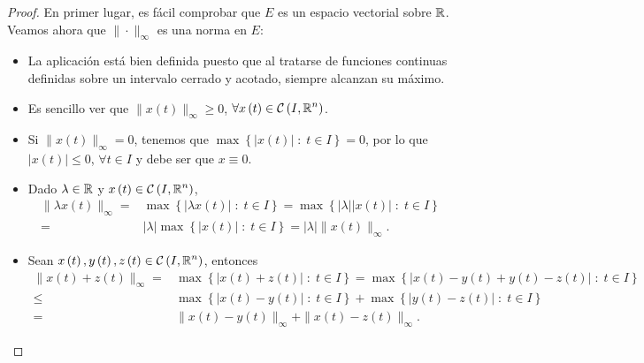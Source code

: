 \begin{proof}
	En primer lugar, es fácil comprobar que $\displaystyle E $ es un espacio vectorial sobre $\displaystyle \mathbb{R} $. Veamos ahora que $\displaystyle \| \cdot \|_{\infty} $ es una norma en $\displaystyle E $:
	\begin{itemize}
	\item La aplicación está bien definida puesto que al tratarse de funciones continuas definidas sobre un intervalo cerrado y acotado, siempre alcanzan su máximo.
	\item Es sencillo ver que $\displaystyle \| x\left(t\right)\|_{\infty} \geq 0 $, $\displaystyle \forall x\left(t\right) \in \mathcal{C}\left(I, \mathbb{R}^{n}\right) $. 
	\item Si $\displaystyle \|x\left(t\right)\|_{\infty}=0 $, tenemos que $\displaystyle \max \left\{ \left|x\left(t\right)\right| \; : \; t \in I\right\} =0  $, por lo que $\displaystyle \left|x\left(t\right)\right|\leq 0 $, $\displaystyle \forall t \in I $ y debe ser que $\displaystyle x \equiv 0 $.
	\item Dado $\displaystyle \lambda \in \mathbb{R} $ y $\displaystyle x\left(t\right)\in \mathcal{C}\left(I, \mathbb{R}^{n}\right) $, 
		\[
		\begin{split}
			\|\lambda x\left(t\right)\|_{\infty} = & \max \left\{ \left|\lambda x\left(t\right)\right| \; : \; t \in I\right\} = \max \left\{ \left|\lambda \right| \left|x\left(t\right)\right| \; : \; t \in I\right\} \\
			= &  \left|\lambda \right| \max \left\{ \left|x\left(t\right)\right|\; : \; t \in I\right\} =\left|\lambda \right|  \|x\left(t\right)\|_{\infty} .
		\end{split}
		\]
	\item Sean $\displaystyle x\left(t\right), y\left(t\right), z\left(t\right) \in \mathcal{C}\left(I, \mathbb{R}^{n}\right) $, entonces
		\[
		\begin{split}
			\|x\left(t\right)+z\left(t\right)\|_{\infty} = & \max \left\{ \left|x\left(t\right) + z\left(t\right)\right| \; : \; t \in I\right\} = \max \left\{ \left|x\left(t\right)-y\left(t\right)+y\left(t\right)-z\left(t\right)\right| \; : \; t \in I\right\}\\
			\leq & \max \left\{ \left|x\left(t\right)-y\left(t\right)\right|\; : \; t \in I\right\} + \max \left\{ \left|y\left(t\right)-z\left(t\right)\right| \; : \; t \in I\right\} \\
			= &  \|x\left(t\right)-y\left(t\right)\|_{\infty} + \|x\left(t\right)-z\left(t\right)\|_{\infty}.
		\end{split}
\]
\end{itemize}
\end{proof}

